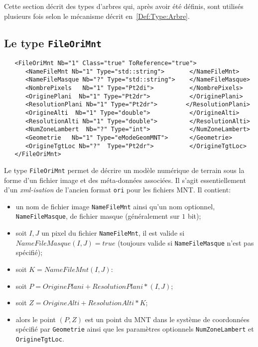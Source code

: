 Cette section d\'ecrit des types d'arbres qui, apr\`es 
avoir \'et\'e d\'efinis, sont utilis\'es
plusieurs fois  selon le m\'ecanisme d\'ecrit en~\ref{Def:Type:Arbre}.

\subsection{Le type {\tt FileOriMnt}}
\label{Def:FOM}

\begin{verbatim}
   <FileOriMnt Nb="1" Class="true" ToReference="true">
      <NameFileMnt Nb="1" Type="std::string">       </NameFileMnt>
      <NameFileMasque Nb="?" Type="std::string">    </NameFileMasque>
      <NombrePixels   Nb="1" Type="Pt2di">          </NombrePixels>
      <OriginePlani  Nb="1" Type="Pt2dr">           </OriginePlani>
      <ResolutionPlani Nb="1" Type="Pt2dr">        </ResolutionPlani>
      <OrigineAlti  Nb="1" Type="double">           </OrigineAlti>
      <ResolutionAlti Nb="1" Type="double">         </ResolutionAlti>
      <NumZoneLambert  Nb="?" Type="int">           </NumZoneLambert>
      <Geometrie   Nb="1" Type="eModeGeomMNT">      </Geometrie>
      <OrigineTgtLoc Nb="?"  Type="Pt2dr">          </OrigineTgtLoc>
   </FileOriMnt>
\end{verbatim}

Le type {\tt FileOriMnt} permet de d\'ecrire un mod\`ele num\'erique de terrain 
sous la forme d'un fichier image et des m\'eta-donn\'ees associ\'ees.
Il s'agit essentiellement d'un \emph{xml-isation} de l'ancien format
{\tt ori} pour les fichiers MNT.
Il contient:

\begin{itemize}
   \item un nom de fichier image {\tt NameFileMnt} ainsi qu'un nom
         optionnel, {\tt NameFileMasque}, de fichier masque (g\'en\'eralement
	 sur $1$ bit);

   \item soit $I,J$ un pixel du fichier {\tt NameFileMnt}, il est valide
         si $NameFileMasque(I,J) = true$ (toujours valide 
	 si {\tt NameFileMasque} n'est pas sp\'ecifi\'e);
    \item soit $K=NameFileMnt(I,J)$:
    \item   soit $P = OriginePlani+ResolutionPlani*(I,J)$;
    \item   soit $Z = OrigineAlti+ResolutionAlti*K$;
    \item alors le point $(P,Z)$ est un point du MNT dans le syst\`eme de
    coordonn\'ees sp\'ecifi\'e par {\tt Geometrie} ainsi que les param\`etres
    optionnels {\tt NumZoneLambert} et {\tt OrigineTgtLoc}.
\end{itemize}



